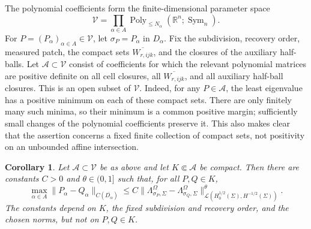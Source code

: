 \documentclass[10pt,a4paper]{amsart}
\newtheorem{corollary}[theorem]{Corollary}
\newcommand{\R}{\mathbb R}
\newcommand{\DN}{\Lambda}
\newcommand{\Sym}{\operatorname{Sym}}
\begin{document}
The polynomial coefficients form the finite-dimensional parameter space
\begin{equation}
  \mathcal V=\prod_{\alpha\in A}
  \operatorname{Poly}_{\le N_\alpha}(\R^n;\Sym_n).
\end{equation}
For \(P=(P_\alpha)_{\alpha\in A}\in\mathcal V\), let \(\sigma_P=P_\alpha\)
in \(D_\alpha\).  Fix the subdivision, recovery order, measured patch, the
compact sets \(\overline{W_{r,ijk}}\), and the closures of the auxiliary
half-balls.  Let \(\mathcal A\subset\mathcal V\) consist of coefficients for
which the relevant polynomial matrices are positive definite on all cell
closures, all \(\overline{W_{r,ijk}}\), and all auxiliary half-ball closures.
This is an open subset of \(\mathcal V\).  Indeed, for any
\(P\in\mathcal A\), the least eigenvalue has a positive minimum on each of
these compact sets.  There are only finitely many such minima, so their minimum
is a common positive margin; sufficiently small changes of the polynomial
coefficients preserve it.  This also makes clear that the assertion concerns a
fixed finite collection of compact sets, not positivity on an unbounded affine
intersection.

\begin{corollary}
\label{cor:holder-stability}
Let \(\mathcal A\subset\mathcal V\) be as above and let
\(K\Subset \mathcal A\) be compact.  Then there are constants
\(C>0\) and \(\theta\in(0,1]\) such that, for all \(P,Q\in K\),
\begin{equation}
  \max_{\alpha\in A}
  \|P_\alpha-Q_\alpha\|_{C(\overline{D_\alpha})}
  \le
  C\bigl\|
  \DN^\Omega_{\sigma_P,\Sigma}
  -\DN^\Omega_{\sigma_Q,\Sigma}
  \bigr\|_{\mathcal L(H^{1/2}_0(\Sigma),H^{-1/2}(\Sigma))}^{\theta}.
  \label{eq:holder-stability-corollary}
\end{equation}
The constants depend on \(K\), the fixed subdivision and recovery order, and the
chosen norms, but not on \(P,Q\in K\).
\end{corollary}
\end{document}
